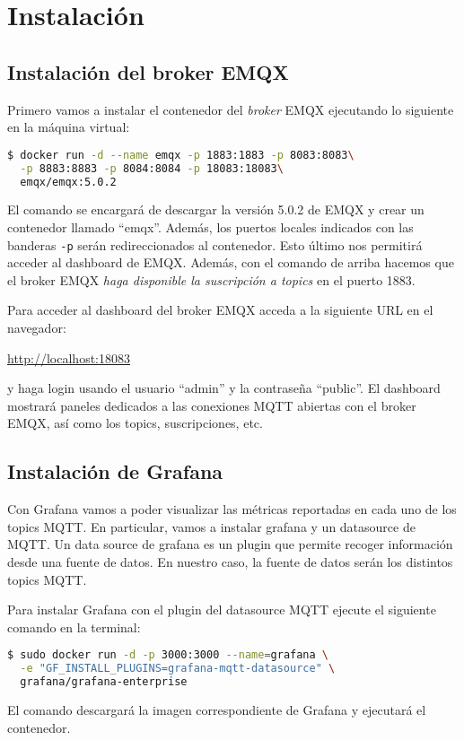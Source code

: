 \documentclass{upmassignment}
\begin{document}
\section*{Instalación}

\subsection*{Instalación del broker EMQX}
Primero vamos a instalar el contenedor
del \emph{broker} EMQX ejecutando lo
siguiente en la máquina virtual:
\begin{lstlisting}[language=bash]
$ docker run -d --name emqx -p 1883:1883 -p 8083:8083\
  -p 8883:8883 -p 8084:8084 -p 18083:18083\
  emqx/emqx:5.0.2
\end{lstlisting}
El comando se encargará de descargar la
versión 5.0.2 de EMQX y crear un contenedor
llamado ``emqx''. Además, los puertos
locales indicados con las banderas \texttt{-p}
serán redireccionados al contenedor. Esto
último nos permitirá acceder al dashboard
de EMQX.
Además, con el comando de arriba
hacemos que el broker EMQX
\emph{haga disponible
la suscripción a topics} en el
puerto 1883.

Para acceder al dashboard del broker
EMQX acceda a la
siguiente URL en el navegador:
\begin{center}
\url{http://localhost:18083}
\end{center}
y haga login usando el usuario
``admin'' y la contraseña ``public''.
El dashboard mostrará paneles dedicados
a las conexiones MQTT abiertas con el
broker EMQX, así
como los topics, suscripciones, etc.


\subsection*{Instalación de Grafana}
Con Grafana vamos a poder visualizar las
métricas reportadas en cada uno de los
topics MQTT. En particular, vamos a
instalar grafana y un datasource de
MQTT. Un data source de grafana
es un plugin que permite recoger información
desde una fuente de datos. En nuestro caso,
la fuente de datos serán los distintos
topics MQTT.

Para instalar Grafana con el plugin
del datasource MQTT ejecute el siguiente
comando en la terminal:
\begin{lstlisting}[language=bash]
$ sudo docker run -d -p 3000:3000 --name=grafana \
  -e "GF_INSTALL_PLUGINS=grafana-mqtt-datasource" \
  grafana/grafana-enterprise
\end{lstlisting}
El comando descargará la imagen correspondiente
de Grafana y ejecutará el contenedor.
\end{document}
